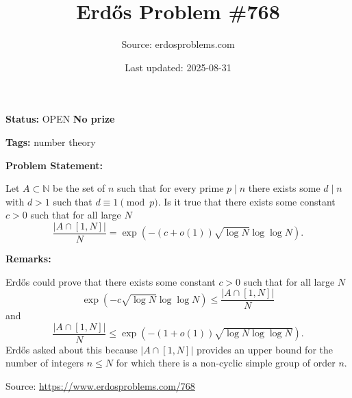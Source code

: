 \documentclass{article}
\title{Erd\H{o}s Problem \#768}
\date{Last updated: 2025-08-31}
\author{Source: erdosproblems.com}
\begin{document}
\maketitle

\noindent\textbf{Status:} OPEN \quad \textbf{No prize}

\noindent\textbf{Tags:} number theory

\medskip
\noindent\textbf{Problem Statement:}

Let $A\subset\mathbb{N}$ be the set of $n$ such that for every prime $p\mid n$ there exists some $d\mid n$ with $d>1$ such that $d\equiv 1\pmod{p}$. Is it true that there exists some constant $c>0$ such that for all large $N$\[\frac{\lvert A\cap [1,N]\rvert}{N}=\exp(-(c+o(1))\sqrt{\log N}\log\log N).\]

\bigskip
\noindent\textbf{Remarks:}

Erd\H{o}s could prove that there exists some constant $c>0$ such that for all large $N$\[\exp(-c\sqrt{\log N}\log\log N)\leq \frac{\lvert A\cap [1,N]\rvert}{N}\]and\[\frac{\lvert A\cap [1,N]\rvert}{N}\leq \exp(-(1+o(1))\sqrt{\log N\log\log N}).\]Erd\H{o}s asked about this because $\lvert A\cap [1,N]\rvert$ provides an upper bound for the number of integers $n\leq N$ for which there is a non-cyclic simple group of order $n$.

\bigskip
\noindent\small{Source: \url{https://www.erdosproblems.com/768}}
\end{document}
